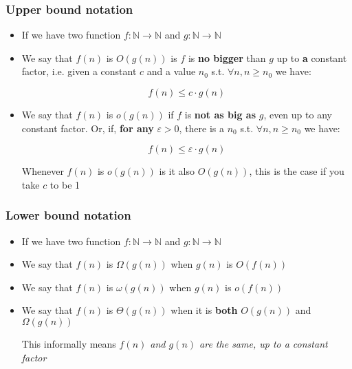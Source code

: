 \documentclass{beamer}
\newcommand{\N}{\mathbb{N}}
\begin{document}
  \begin{frame}
    \frametitle{Upper bound notation}

    \begin{itemize}
      \item     If we have two function $f : \N \rightarrow \N$ and $g : \N \rightarrow \N$
      \item We say that $f(n)$ is $O(g(n))$ is $f$ is \textbf{no bigger} than $g$ up to \textbf{a}  constant factor, i.e. given a constant $c$ and a value $n_{0}$ s.t. $\forall n, n \geq n_{0}$ we have:

            \[
            f(n) \leq c\cdot g(n)
            \]

      \item We say that $f(n)$ is $o(g(n))$ if $f$ is \textbf{not as big as }$g$, even up to any constant factor. Or, if, \textbf{for any} $\varepsilon > 0$, there is a $n_{0}$ s.t. $\forall n, n\geq n_{0}$ we have:

            \[
            f(n) \leq \varepsilon \cdot g(n)
            \]

            Whenever $f(n)$ is $o(g(n))$ is it also $O(g(n))$, this is the case if you take $c$ to be 1

    \end{itemize}


  \end{frame}

  \begin{frame}
    \frametitle{Lower bound notation}

    \begin{itemize}
      \item     If we have two function $f : \N \rightarrow \N$ and $g : \N \rightarrow \N$
      \item We say that $f(n)$ is $\Omega(g(n))$ when $g(n)$ is $O(f(n))$
      \item We say that $f(n)$ is $\omega(g(n))$ when $g(n)$ is $o(f(n))$
      \item We say that $f(n)$ is $\Theta(g(n))$ when it is \textbf{both} $O(g(n))$ and $\Omega(g(n))$

            This informally means \textit{$f(n)$ and $g(n)$ are the same, up to a constant factor}
    \end{itemize}
  \end{frame}
\end{document}
